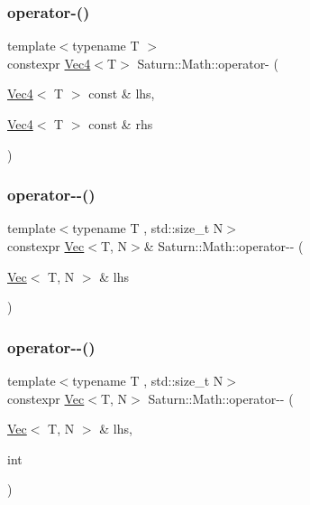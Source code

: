 \subsubsection{\texorpdfstring{operator-\/()}{operator-()}\hspace{0.1cm}{\footnotesize\ttfamily [4/4]}}
{\footnotesize\ttfamily template$<$typename T $>$ \\
constexpr \mbox{\hyperlink{namespace_saturn_1_1_math_a311b3d690ef397050af7963caa08d1bd}{Vec4}}$<$T$>$ Saturn\+::\+Math\+::operator-\/ (\begin{DoxyParamCaption}\item[{\mbox{\hyperlink{namespace_saturn_1_1_math_a311b3d690ef397050af7963caa08d1bd}{Vec4}}$<$ T $>$ const \&}]{lhs,  }\item[{\mbox{\hyperlink{namespace_saturn_1_1_math_a311b3d690ef397050af7963caa08d1bd}{Vec4}}$<$ T $>$ const \&}]{rhs }\end{DoxyParamCaption})}

\mbox{\label{namespace_saturn_1_1_math_a162d9aa139e50ae1407420a366152188}} 
\subsubsection{\texorpdfstring{operator-\/-\/()}{operator--()}\hspace{0.1cm}{\footnotesize\ttfamily [1/2]}}
{\footnotesize\ttfamily template$<$typename T , std\+::size\+\_\+t N$>$ \\
constexpr \mbox{\hyperlink{class_saturn_1_1_math_1_1_vec}{Vec}}$<$T, N$>$\& Saturn\+::\+Math\+::operator-\/-\/ (\begin{DoxyParamCaption}\item[{\mbox{\hyperlink{class_saturn_1_1_math_1_1_vec}{Vec}}$<$ T, N $>$ \&}]{lhs }\end{DoxyParamCaption})}

\mbox{\label{namespace_saturn_1_1_math_af3e23719dc49c0ddac70aa33032eb3ab}} 
\subsubsection{\texorpdfstring{operator-\/-\/()}{operator--()}\hspace{0.1cm}{\footnotesize\ttfamily [2/2]}}
{\footnotesize\ttfamily template$<$typename T , std\+::size\+\_\+t N$>$ \\
constexpr \mbox{\hyperlink{class_saturn_1_1_math_1_1_vec}{Vec}}$<$T, N$>$ Saturn\+::\+Math\+::operator-\/-\/ (\begin{DoxyParamCaption}\item[{\mbox{\hyperlink{class_saturn_1_1_math_1_1_vec}{Vec}}$<$ T, N $>$ \&}]{lhs,  }\item[{int}]{ }\end{DoxyParamCaption})}

